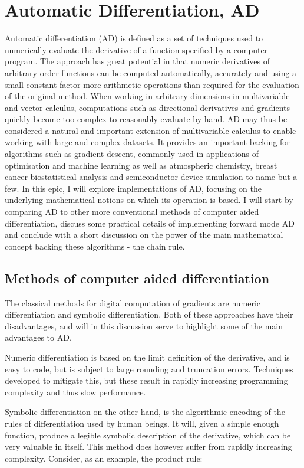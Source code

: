 \documentclass[11pt]{article}
\begin{document}
\section{Automatic Differentiation, AD}
Automatic differentiation (AD) is defined as a set of techniques used to numerically evaluate the derivative of a function specified by a computer program. The approach has great potential in that numeric derivatives of arbitrary order functions can be computed automatically, accurately and using a small constant factor more arithmetic operations than required for the evaluation of the original method. When working in arbitrary dimensions in multivariable and vector calculus, computations such as directional derivatives and gradients quickly become too complex to reasonably evaluate by hand. AD may thus be considered a natural and important extension of multivariable calculus to enable working with large and complex datasets. It provides an important backing for algorithms such as gradient descent, commonly used in applications of optimisation and machine learning as well as atmospheric chemistry, breast cancer biostatistical analysis and semiconductor device simulation to name but a few. In this epic, I will explore implementations of AD, focusing on the underlying mathematical notions on which its operation is based. I will start by comparing AD to other more conventional methods of computer aided differentiation, discuss some practical details of implementing forward mode AD and conclude with a short discussion on the power of the main mathematical concept backing these algorithms - the chain rule.

\subsection{Methods of computer aided differentiation}

The classical methods for digital computation of gradients are numeric differentiation and symbolic differentiation. Both of these approaches have their disadvantages, and will in this discussion serve to highlight some of the main advantages to AD.

Numeric differentiation is based on the limit definition of the derivative, and is easy to code, but is subject to large rounding and truncation errors. Techniques developed to mitigate this, but these result in rapidly increasing programming complexity and thus slow performance.

Symbolic differentiation on the other hand, is the algorithmic encoding of the rules of differentiation used by human beings. It will, given a simple enough function, produce a legible symbolic description of the derivative, which can be very valuable in itself. This method does however suffer from rapidly increasing complexity. Consider, as an example, the product rule:
\end{document}
